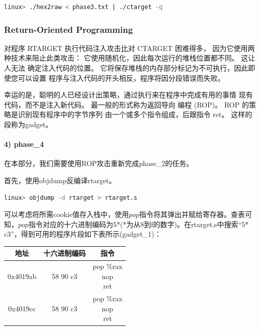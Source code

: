 \documentclass{article}
\begin{document}
\begin{lstlisting}[language=bash]
    linux> ./hex2raw < phase3.txt | ./ctarget -q
  \end{lstlisting}

\subsubsection{Return-Oriented Programming}

对程序 RTARGET 执行代码注入攻击比对 CTARGET 困难得多，
因为它使用两种技术来阻止此类攻击：
它使用随机化，因此每次运行的堆栈位置都不同。 这让人无法
确定注入代码的位置。
它将保存堆栈的内存部分标记为不可执行，因此即使您可以设置
程序与注入代码的开头相反，程序将因分段错误而失败。


幸运的是，聪明的人已经设计出策略，通过执行来在程序中完成有用的事情
现有代码，而不是注入新代码。 最一般的形式称为返回导向
编程 (ROP)。 ROP 的策略是识别现有程序中的字节序列
由一个或多个指令组成，后跟指令 ret。 这样的段称为gadget。

\paragraph*{4) phase\_4}
在本部分，我们需要使用ROP攻击重新完成phase\_2的任务。

首先，使用objdump反编译rtarget。
\begin{lstlisting}[language=bash]
    linux> objdump -d rtarget > rtarget.s
  \end{lstlisting}

可以考虑将所需cookie值存入栈中，使用$pop$指令将其弹出并赋给寄存器。查表可知，$pop$指令对应的十六进制编码为5*(*为从8到f的数字)。在rtarget.s中搜索“5* c3”，得到可用的程序片段如下表所示(gadget\_1)：

\begin{table}[H]
  \begin{center}
    \begin{tabular}{|c|c|c|}
      \hline
      地址     & 十六进制编码 & 指令                \\
      \hline
      0x4019ab & 58 90 c3     & \thead[l]{pop \%rax \\ nop \\ ret} \\
      \hline
      0x4019cc & 58 90 c3     & \thead[l]{pop \%rax \\ nop \\ ret} \\
      \hline
    \end{tabular}
  \end{center}
\end{table}
\end{document}
